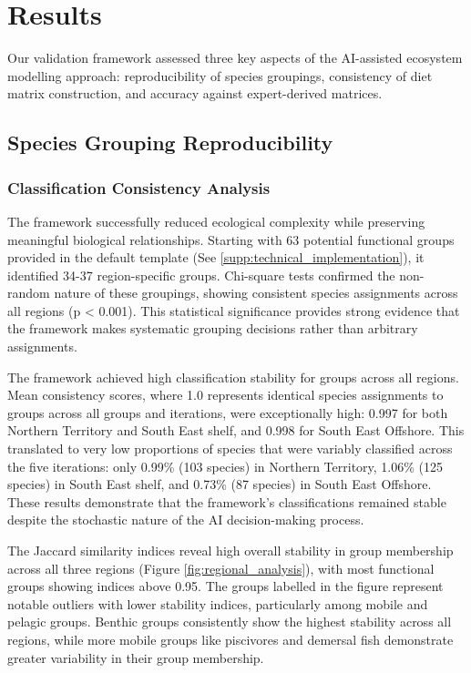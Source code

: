 \section{Results}

Our validation framework assessed three key aspects of the AI-assisted ecosystem modelling approach: reproducibility of species groupings, consistency of diet matrix construction, and accuracy against expert-derived matrices. 

\subsection{Species Grouping Reproducibility}

\subsubsection{Classification Consistency Analysis}
The framework successfully reduced ecological complexity while preserving meaningful biological relationships. Starting with 63 potential functional groups provided in the default template (See \ref{supp:technical_implementation}), it identified 34-37 region-specific groups. Chi-square tests confirmed the non-random nature of these groupings, showing consistent species assignments across all regions (p < 0.001). This statistical significance provides strong evidence that the framework makes systematic grouping decisions rather than arbitrary assignments.

The framework achieved high classification stability for groups across all regions. Mean consistency scores, where 1.0 represents identical species assignments to groups across all groups and iterations, were exceptionally high: 0.997 for both Northern Territory and South East shelf, and 0.998 for South East Offshore. This translated to very low proportions of species that were variably classified across the five iterations: only 0.99\% (103 species) in Northern Territory, 1.06\% (125 species) in South East shelf, and 0.73\% (87 species) in South East Offshore. These results demonstrate that the framework's classifications remained stable despite the stochastic nature of the AI decision-making process.

The Jaccard similarity indices reveal high overall stability in group membership across all three regions (Figure \ref{fig:regional_analysis}), with most functional groups showing indices above 0.95. The groups labelled in the figure represent notable outliers with lower stability indices, particularly among mobile and pelagic groups. Benthic groups consistently show the highest stability across all regions, while more mobile groups like piscivores and demersal fish demonstrate greater variability in their group membership.

